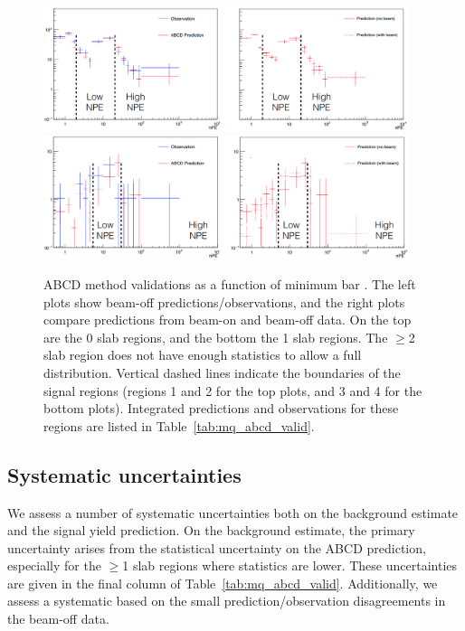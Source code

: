 {\begin{figure}[t]
  \begin{center}
    \includegraphics[width=0.95\textwidth]{figs/milliq/abcd_valid_0slab.png} \vskip2mm
    \includegraphics[width=0.95\textwidth]{figs/milliq/abcd_valid_1slab.png}
    \caption{ABCD method validations as a function of minimum bar \Npe.
      The left plots show beam-off predictions/observations, and the right
      plots compare predictions from beam-on and beam-off data.
      On the top are the 0 slab regions, and the bottom the 1 slab regions.
      The $\geq$2 slab region does not have enough statistics to allow
      a full \Npe distribution. Vertical dashed lines indicate
      the boundaries of the signal regions (regions 1 and 2 for the top plots,
      and 3 and 4 for the bottom plots). Integrated predictions and
      observations for these regions are listed in Table~\ref{tab:mq_abcd_valid}.
            }
    \label{fig:mq_abcd_valid}
  \end{center}
\end{figure}


\subsection{Systematic uncertainties}

We assess a number of systematic uncertainties both on the background estimate and the
signal yield prediction. On the background estimate, the primary uncertainty arises
from the statistical uncertainty on the ABCD prediction, especially for the $\geq$1
slab regions where statistics are lower. These uncertainties are given
in the final column of Table~\ref{tab:mq_abcd_valid}. Additionally, we assess a systematic
based on the small prediction/observation disagreements in the beam-off data.

}
